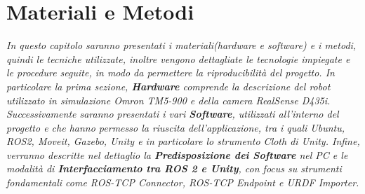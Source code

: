 \documentclass[11pt]{report}
\begin{document}

\newpage
\chapter{Materiali e Metodi}
\textit{In questo capitolo saranno presentati i materiali(hardware e software) e i metodi, quindi le tecniche utilizzate, inoltre vengono dettagliate le tecnologie impiegate e le procedure seguite, in modo da permettere la riproducibilità del progetto. In particolare la prima sezione, \textbf{Hardware} comprende la descrizione del robot utilizzato in simulazione Omron TM5-900 e della camera RealSense D435i. Successivamente saranno presentati i vari \textbf{Software}, utilizzati all'interno del progetto e che hanno permesso la riuscita dell'applicazione, tra i quali Ubuntu, ROS2, Moveit, Gazebo, Unity e in particolare lo strumento Cloth di Unity. Infine, verranno descritte nel dettaglio la \textbf{Predisposizione dei Software} nel PC e le modalità di \textbf{Interfacciamento tra ROS 2 e Unity}, con focus su strumenti fondamentali come ROS-TCP Connector, ROS-TCP Endpoint e URDF Importer.}
\end{document}
